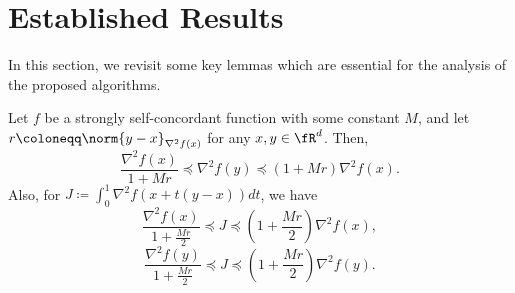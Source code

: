 \section{Established Results} \label{appendix:key_lemmas}
In this section, we revisit some key lemmas which are essential for the analysis of the proposed algorithms. 
\begin{lemma}
    Let $f$ be a strongly self-concordant function with some constant $M$, and let $r \coloneqq   \norm{y - x}_{\nabla^2 f(x)} $ for any $x, y \in \fR^d$. Then,
    \begin{equation}
        \frac{\nabla^2 f(x)}{1 + Mr} \preceq \nabla^2 f(y) \preceq (1 + M r) \nabla^2 f(x).
        \label{matrix_approx_1}
    \end{equation}
    Also, for $J \coloneqq \int_{0}^1 \nabla^2 f(x + t(y - x))dt$, we have
    \begin{equation}
        \frac{\nabla^2 f(x)}{1 + \frac{M r}{2}} \preceq J \preceq \left(1 + \frac{M r}{2}\right) \nabla^2 f(x),
    \end{equation}
    \begin{equation}
        \frac{\nabla^2 f(y)}{1 + \frac{Mr}{2}} \preceq J \preceq \left(1 + \frac{M r}{2}\right)\nabla^2 f(y).
    \end{equation}
    \label{lemma:matrix_approx}
\end{lemma}

